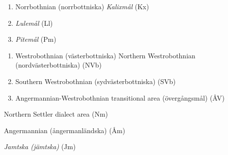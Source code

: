 \begin{enumerate} %
\item 
Norrbothnian (norrbottniska)  \textit{Kalixmål} (Kx)

\item 
\textit{Lulemål} (Ll)

\item 
\textit{Pitemål} (Pm)

\end{enumerate} %
\begin{enumerate} %
\item 
Westrobothnian (västerbottniska)  Northern Westrobothnian (nordvästerbottniska) (NVb)

\item 
Southern Westrobothnian\newline
(sydvästerbottniska) (SVb)

\item 
Angermannian-Westrobothnian\newline
transitional area (övergångsmål) (ÅV)

\end{enumerate} %
Northern Settler dialect area (Nm)  


Angermannian (ångermanländska) (Åm)  


\textit{Jamtska (jämtska)} (Jm)  


